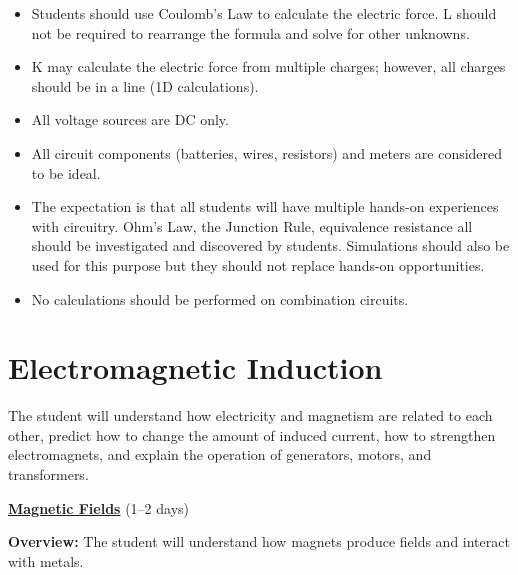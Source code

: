 \documentclass[dvipsnames]{article}
\begin{document}
\begin{itemize}[topsep=-3pt,itemsep=0pt]
    \item Students should use Coulomb's Law to calculate the electric force. L should not be required to rearrange the formula and solve for other unknowns.
    \item K may calculate the electric force from multiple charges; however, all charges should be in a line (1D calculations).
    \item All voltage sources are DC only.
    \item All circuit components (batteries, wires, resistors) and meters are considered to be ideal.
    \item The expectation is that all students will have multiple hands-on experiences with circuitry. Ohm's Law, the Junction Rule, equivalence resistance all should be investigated and discovered by students. Simulations should also be used for this purpose but they should not replace hands-on opportunities.
    \item No calculations should be performed on combination circuits.
\end{itemize}

\clearpage
\section{Electromagnetic Induction}

\vspace{-3pt}
The student will understand how electricity and magnetism are related to each other, predict how to change the amount of induced current, how to strengthen electromagnets, and explain the operation of generators, motors, and transformers.
\vspace{3pt}

\textbf{\underline{Magnetic Fields}} (1--2 days)

\textbf{Overview:} The student will understand how magnets produce fields and interact with metals.
\end{document}

